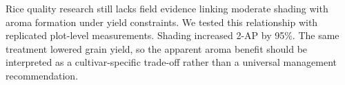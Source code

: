 Rice quality research still lacks field evidence linking moderate shading with aroma formation under yield constraints. We tested this relationship with replicated plot-level measurements. Shading increased 2-AP by 95\%. The same treatment lowered grain yield, so the apparent aroma benefit should be interpreted as a cultivar-specific trade-off rather than a universal management recommendation.

